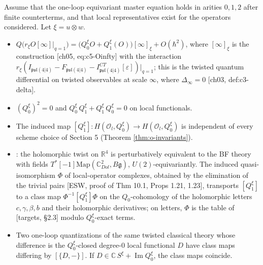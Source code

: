 \begin{theorem}
\label{thm:o-twist}
Assume that the one-loop equivariant master equation holds in arities $0,1,2$ after finite counterterms, and that local representatives exist for the operators considered. Let $\xi=u\otimes w$.
\begin{itemize}
\item[(i)] $Q\big(r_\xi O[\infty]|_{q=1}\big)=\big(Q_0^\xi O+Q_1^\xi(O)\big)[\infty]_\xi+O(\hbar^2)$, where $[\infty]_\xi$ is the construction [ch05, eq:c5-Oinfty] with the interaction $r_\xi(I_{\mathfrak{psl}(4|4)}-F_{\mathfrak{psl}(4|4)}-I^{CT}_{\mathfrak{psl}(4|4)}[\varepsilon])|_{q=1}$; this is the twisted quantum differential on twisted observables at scale $\infty$, where $\Delta_\infty=0$ [ch03, def:c3-delta].
\item[(ii)] $(Q_0^\xi)^2=0$ and $Q_0^\xi\,Q_1^\xi+Q_1^\xi\,Q_0^\xi=0$ on local functionals.
\item[(iii)] The induced map $[Q_1^\xi]\colon H(\mathscr O_l,Q_0^\xi)\to H(\mathscr O_l,Q_0^\xi)$ is independent of every scheme choice of Section 5 (Theorem \ref{thm:o-invariants}).
\item[(iv)] [ESW, Thm 10.9]: the holomorphic twist on $\mathbb R^4$ is perturbatively equivalent to the BF theory with fields $T^*[-1]\mathrm{Map}(\mathbb C^2_{Dol},B\mathfrak g)$, $U(2)$-equivariantly. The induced quasi-isomorphism $\Phi$ of local-operator complexes, obtained by the elimination of the trivial pairs [ESW, proof of Thm 10.1, Props 1.21, 1.23], transports $[Q_1^\xi]$ to a class map $\Phi^{-1}[Q_1^\xi]\Phi$ on the $Q_0$-cohomology of the holomorphic letters $c,\gamma,\beta,b$ and their holomorphic derivatives; on letters, $\Phi$ is the table of [targets, §2.3] modulo $Q_0^\xi$-exact terms.
\item[(v)] Two one-loop quantizations of the same twisted classical theory whose difference is the $Q_0^\xi$-closed degree-$0$ local functional $D$ have class maps differing by $[\{D,-\}]$. If $D\in\mathbb C\,S^\xi+\operatorname{Im}Q_0^\xi$, the class maps coincide.
\end{itemize}
\end{theorem}

